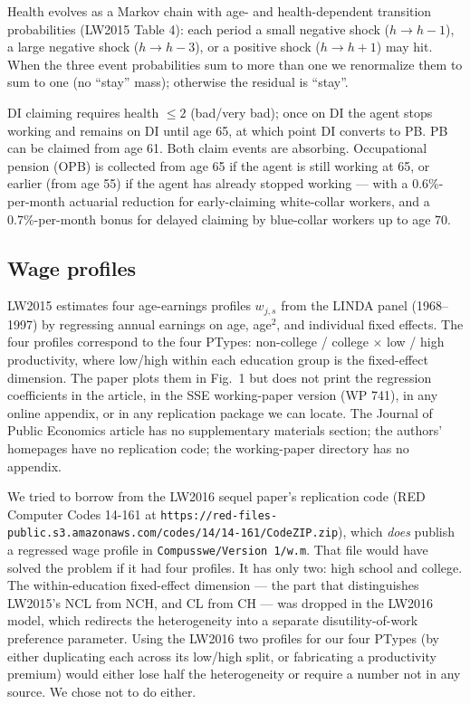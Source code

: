 \documentclass[11pt,fleqn]{article}
\begin{document}
Health evolves as a Markov chain with age- and health-dependent transition probabilities (LW2015 Table 4): each period a small negative shock ($h\to h-1$), a large negative shock ($h\to h-3$), or a positive shock ($h\to h+1$) may hit. When the three event probabilities sum to more than one we renormalize them to sum to one (no ``stay'' mass); otherwise the residual is ``stay''.

DI claiming requires health $\le 2$ (bad/very bad); once on DI the agent stops working and remains on DI until age 65, at which point DI converts to PB. PB can be claimed from age 61. Both claim events are absorbing. Occupational pension (OPB) is collected from age 65 if the agent is still working at 65, or earlier (from age 55) if the agent has already stopped working --- with a 0.6\%-per-month actuarial reduction for early-claiming white-collar workers, and a 0.7\%-per-month bonus for delayed claiming by blue-collar workers up to age 70.

\subsection*{Wage profiles}\label{sec:wage-profiles}
LW2015 estimates four age-earnings profiles $w_{j,s}$ from the LINDA panel (1968--1997) by regressing annual earnings on age, age$^2$, and individual fixed effects. The four profiles correspond to the four PTypes: non-college / college $\times$ low / high productivity, where low/high within each education group is the fixed-effect dimension. The paper plots them in Fig.~1 but does not print the regression coefficients in the article, in the SSE working-paper version (WP 741), in any online appendix, or in any replication package we can locate. The Journal of Public Economics article has no supplementary materials section; the authors' homepages have no replication code; the working-paper directory has no appendix.

We tried to borrow from the LW2016 sequel paper's replication code (RED Computer Codes 14-161 at \texttt{https://red-files-public.s3.amazonaws.com/codes/14/14-161/CodeZIP.zip}), which \emph{does} publish a regressed wage profile in \texttt{Compusswe/Version~1/w.m}. That file would have solved the problem if it had four profiles. It has only two: high school and college. The within-education fixed-effect dimension --- the part that distinguishes LW2015's NCL from NCH, and CL from CH --- was dropped in the LW2016 model, which redirects the heterogeneity into a separate disutility-of-work preference parameter. Using the LW2016 two profiles for our four PTypes (by either duplicating each across its low/high split, or fabricating a productivity premium) would either lose half the heterogeneity or require a number not in any source. We chose not to do either.
\end{document}
